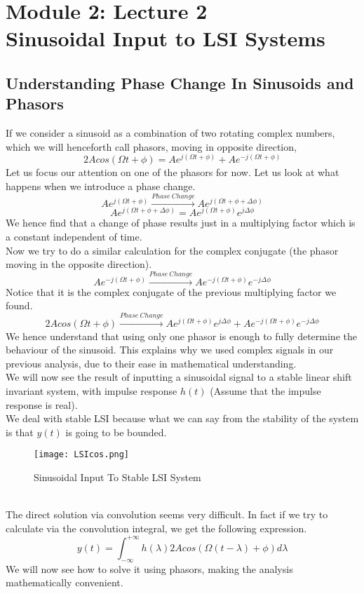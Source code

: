 \section{Module 2: Lecture 2\\Sinusoidal Input to LSI Systems}



\subsection{Understanding Phase Change In Sinusoids and Phasors}
If we consider a sinusoid as a combination of two rotating complex numbers, which we will henceforth call phasors, moving in opposite direction, 
\[
	2Acos(\Omega t + \phi) = Ae^{j(\Omega t + \phi)} + Ae^{-j(\Omega t + \phi)}
\]
Let us focus our attention on one of the phasors for now. Let us look at what happens when we introduce a phase change.\\
\[
Ae^{j(\Omega t + \phi)} \xrightarrow{Phase \ Change} Ae^{j(\Omega t + \phi + \Delta\phi)}
\]
\[
Ae^{j(\Omega t + \phi + \Delta\phi)} =
Ae^{j(\Omega t + \phi)}e^{j\Delta\phi}
\]
We hence find that a change of phase results just in a multiplying factor which is a constant independent of time.\\
Now we try to do a similar calculation for the complex conjugate (the phasor moving in the opposite direction).
\[
Ae^{-j(\Omega t + \phi)} \xrightarrow{Phase \ Change} Ae^{-j(\Omega t + \phi)}e^{-j\Delta\phi}
\]
Notice that it is the complex conjugate of the previous multiplying factor we found.\\
\[
	2Acos(\Omega t + \phi) \xrightarrow{Phase \ Change} Ae^{j(\Omega t + \phi)}e^{j\Delta\phi} + Ae^{-j(\Omega t + \phi)}e^{-j\Delta\phi}
\]
We hence understand that using only one phasor is enough to fully determine the behaviour of the sinusoid. This explains why we used complex signals in our previous analysis, due to their ease in mathematical understanding.\\
We will now see the result of inputting a sinusoidal signal to a stable linear shift invariant system, with impulse response $h(t)$ (Assume that the impulse response is real).\\
We deal with stable LSI because what we can say from the stability of the system is that $y(t)$ is going to be bounded.\\
\begin{figure}[ht]
\begin{center}
\texttt{[image: LSIcos.png]}
\caption{Sinusoidal Input To Stable LSI System}
\end{center}
\end{figure}\\
The direct solution via convolution seems very difficult. In fact if we try to calculate via the convolution integral, we get the following expression.
\[
y(t) = \int_{-\infty}^{+\infty}{h(\lambda)2Acos(\Omega(t-\lambda) + \phi)d\lambda}\]
We will now see how to solve it using phasors, making the analysis mathematically convenient.

